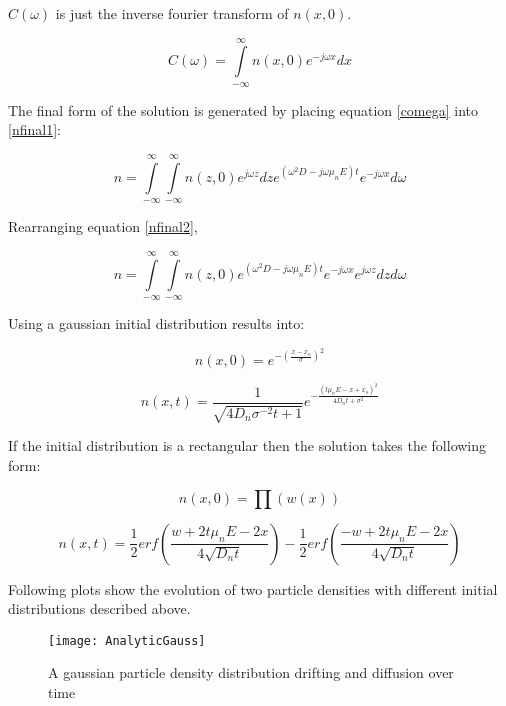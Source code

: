 \begin{doublespace}
$C(\omega)$ is just the inverse fourier transform of $n(x,0)$.

\begin{equation}
C(\omega)=\int\limits_{-\infty}^{\infty}n(x,0)e^{-j\omega x}dx
\label{comega}
\end{equation}

The final form of the solution is generated by placing equation \eqref{comega} into \eqref{nfinal1}:

\begin{equation}
n=\int\limits_{-\infty}^{\infty}\int\limits_{-\infty}^{\infty}n(z,0)e^{j\omega z}dz e^{(\omega ^2 D-j\omega \mu_n E)t}e^{-j\omega x}d\omega
\label{nfinal2}
\end{equation}

Rearranging equation \eqref{nfinal2},

\begin{equation}
n=\int\limits_{-\infty}^{\infty}\int\limits_{-\infty}^{\infty}n(z,0) e^{(\omega ^2 D-j\omega \mu_n E)t}e^{-j\omega x} e^{j\omega z}  dz d\omega
\end{equation}

Using a gaussian initial distribution results into:

\begin{equation}
n(x,0)=e^{- (\frac{x-x_o}{\sigma})^2}
\end{equation}

\begin{equation}
n(x,t)=\frac{1}{\sqrt{4D_n\sigma^{-2}t+1}}e^{-\frac{(t\mu_n E-x+x_o)^2}{4D_n t+\sigma^2}}
\end{equation}

If the initial distribution is a rectangular then the solution takes the following form:

\begin{equation}
n(x,0)=\prod (w(x))
\end{equation}

\begin{equation}
n(x,t)=\frac{1}{2} erf(\frac{w+2t \mu_n E-2x}{4\sqrt{D_n t}})-\frac{1}{2}erf(\frac{-w+2t \mu_n E-2x}{4\sqrt{D_n t}}) 
\end{equation}

Following plots show the evolution of two particle densities with different initial distributions described above.

\begin{figure}[!htp]
\centering
\texttt{[image: AnalyticGauss]}
\caption{A gaussian particle density distribution drifting and diffusion over time} 
\end{figure}


\end{doublespace}
